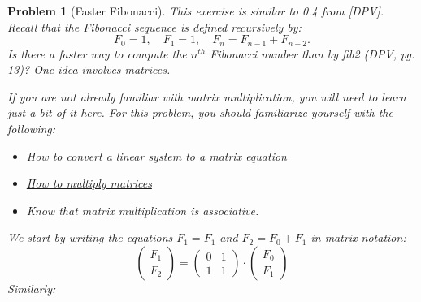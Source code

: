 \documentclass[10pt]{article}
\newtheorem{problem}{\sc\color{cit}Problem}
\begin{document}
\newpage


\begin{problem}[Faster Fibonacci] This exercise is similar to 0.4 from [DPV]. Recall that the Fibonacci sequence is defined recursively by:
\[
    F_0 = 1,\quad F_1=1,\quad F_{n}= F_{n-1}+F_{n-2}.
\]
Is there a faster way to compute the $n^{th}$ Fibonacci number than by \emph{fib2} (DPV, pg. 13)? One idea involves matrices.

If you are not already familiar with matrix multiplication, you will need to learn just a bit of it here. For this problem, you should familiarize yourself with the following:
\begin{itemize}
    \item \href{https://www.khanacademy.org/math/algebra-home/alg-matrices/alg-representing-systems-with-matrices/a/representing-systems-with-matrices}{How to convert a linear system to a matrix equation}
    \item \href{https://www.khanacademy.org/math/precalculus/x9e81a4f98389efdf:matrices/x9e81a4f98389efdf:multiplying-matrices-by-matrices/a/multiplying-matrices}{How to multiply matrices}
    \item Know that matrix multiplication is associative.
\end{itemize}



We start by writing the equations $F_1 = F_1$ and $F_2 = F_0 + F_1$ in matrix notation:
\[
    \begin{pmatrix} F_1 \\ F_2\end{pmatrix} = \begin{pmatrix} 0 & 1\\ 1& 1\end{pmatrix}\cdot \begin{pmatrix} F_0 \\ F_1\end{pmatrix}
\]
Similarly:


\end{problem}
\end{document}
